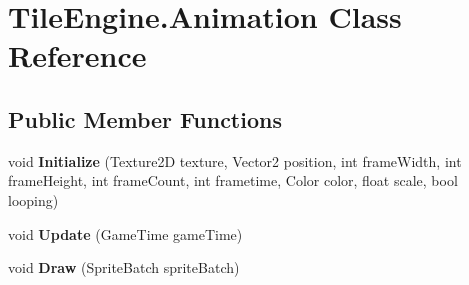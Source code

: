 \hypertarget{class_tile_engine_1_1_animation}{\section{Tile\-Engine.\-Animation Class Reference}
\label{db/d5e/class_tile_engine_1_1_animation}
}
\subsection*{Public Member Functions}
\begin{DoxyCompactItemize}
\item 
\hypertarget{class_tile_engine_1_1_animation_a92f73196e610356a0810345fe97b026d}{void {\bfseries Initialize} (Texture2\-D texture, Vector2 position, int frame\-Width, int frame\-Height, int frame\-Count, int frametime, Color color, float scale, bool looping)}\label{db/d5e/class_tile_engine_1_1_animation_a92f73196e610356a0810345fe97b026d}

\item 
\hypertarget{class_tile_engine_1_1_animation_a2614c6eff471aecefade8b906a489eeb}{void {\bfseries Update} (Game\-Time game\-Time)}\label{db/d5e/class_tile_engine_1_1_animation_a2614c6eff471aecefade8b906a489eeb}

\item 
\hypertarget{class_tile_engine_1_1_animation_ab4dd3a8d57cc8de71f8863ff91238eea}{void {\bfseries Draw} (Sprite\-Batch sprite\-Batch)}\label{db/d5e/class_tile_engine_1_1_animation_ab4dd3a8d57cc8de71f8863ff91238eea}

\end{DoxyCompactItemize}
